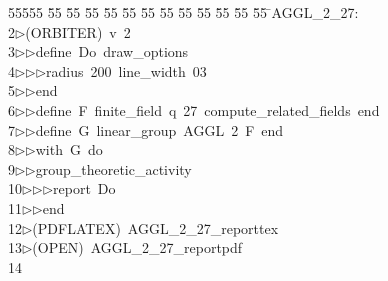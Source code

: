 %
%
\begin{tabbing}
55555 \= 55 \= 55 \= 55 \= 55 \= 55 \= 55 \= 55 \= 55 \= 55 \= 55 \= 55 \= 55 \= \>AGGL\_2\_27:\\[0pt]
2\>$\triangleright$\>(ORBITER)\ v\ 2\ \\[0pt]
3\>$\triangleright$\>$\triangleright$\>define\ Do\ draw\_options\ \\[0pt]
4\>$\triangleright$\>$\triangleright$\>$\triangleright$\>radius\ 200\ line\_width\ 03\ \\[0pt]
5\>$\triangleright$\>$\triangleright$\>end\ \\[0pt]
6\>$\triangleright$\>$\triangleright$\>define\ F\ finite\_field\ q\ 27\ compute\_related\_fields\ end\ \\[0pt]
7\>$\triangleright$\>$\triangleright$\>define\ G\ linear\_group\ AGGL\ 2\ F\ end\ \\[0pt]
8\>$\triangleright$\>$\triangleright$\>with\ G\ do\ \\[0pt]
9\>$\triangleright$\>$\triangleright$\>group\_theoretic\_activity\ \\[0pt]
10\>$\triangleright$\>$\triangleright$\>$\triangleright$\>report\ Do\ \\[0pt]
11\>$\triangleright$\>$\triangleright$\>end\\[0pt]
12\>$\triangleright$\>(PDFLATEX)\ AGGL\_2\_27\_reporttex\\[0pt]
13\>$\triangleright$\>(OPEN)\ AGGL\_2\_27\_reportpdf\\[0pt]
14\>\end{tabbing}
